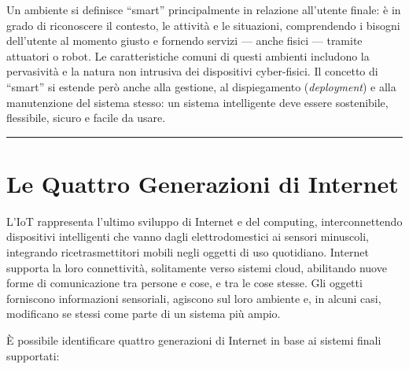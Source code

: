 \documentclass[
  italian,
  openany]{book}
\begin{document}
Un ambiente si definisce ``smart'' principalmente in relazione
all'utente finale: è in grado di riconoscere il contesto, le attività e
le situazioni, comprendendo i bisogni dell'utente al momento giusto e
fornendo servizi --- anche fisici --- tramite attuatori o robot. Le
caratteristiche comuni di questi ambienti includono la pervasività e la
natura non intrusiva dei dispositivi cyber-fisici. Il concetto di
``smart'' si estende però anche alla gestione, al dispiegamento
(\emph{deployment}) e alla manutenzione del sistema stesso: un sistema
intelligente deve essere sostenibile, flessibile, sicuro e facile da
usare.

\begin{center}\rule{0.5\linewidth}{0.5pt}\end{center}

\section{Le Quattro Generazioni di
Internet}\label{le-quattro-generazioni-di-internet}

L'IoT rappresenta l'ultimo sviluppo di Internet e del computing,
interconnettendo dispositivi intelligenti che vanno dagli
elettrodomestici ai sensori minuscoli, integrando ricetrasmettitori
mobili negli oggetti di uso quotidiano. Internet supporta la loro
connettività, solitamente verso sistemi cloud, abilitando nuove forme di
comunicazione tra persone e cose, e tra le cose stesse. Gli oggetti
forniscono informazioni sensoriali, agiscono sul loro ambiente e, in
alcuni casi, modificano se stessi come parte di un sistema più ampio.

È possibile identificare quattro generazioni di Internet in base ai
sistemi finali supportati:
\end{document}
